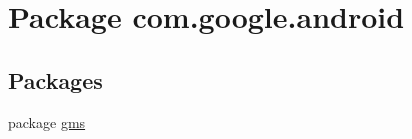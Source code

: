 \hypertarget{namespacecom_1_1google_1_1android}{}\section{Package com.\+google.\+android}
\label{namespacecom_1_1google_1_1android}
\subsection*{Packages}
\begin{DoxyCompactItemize}
\item 
package \mbox{\hyperlink{namespacecom_1_1google_1_1android_1_1gms}{gms}}
\end{DoxyCompactItemize}
